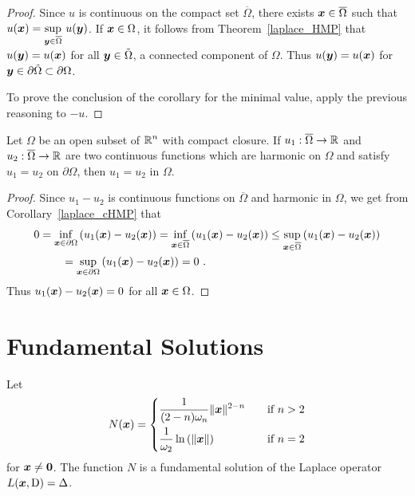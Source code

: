 \begin{proof}
Since $u$ is continuous on the compact set $\overline{\Omega}$, there
exists ${\bm{x}}\in \overline{\Omega}$ such that
$\displaystyle u({\bm{x}}) = \sup_{{\bm{y}}\in \overline{\Omega}}\, u({\bm{y}})$.
If ${\bm{x}} \in \Omega$, it follows from Theorem~\ref{laplace_HMP}
that $u({\bm{y}}) = u({\bm{x}})$ for all ${\bm{y}} \in \tilde{\Omega}$, a
connected component of $\Omega$.  Thus $u({\bm{y}}) = u({\bm{x}})$ for
${\bm{y}} \in \partial \tilde{\Omega} \subset \partial \Omega$.

To prove the conclusion of the corollary for the minimal value, apply
the previous reasoning to $-u$.
\end{proof}

\begin{theorem} \label{laplace_uniqu_th}
Let $\Omega$ be an open subset of $\displaystyle \mathbb{R}^n$ with compact
closure.  If $u_1 : \overline{\Omega} \rightarrow \mathbb{R}$ and
$u_2 : \overline{\Omega} \rightarrow \mathbb{R}$ are two continuous functions
which are harmonic on $\Omega$ and satisfy $u_1 = u_2$ on $\partial \Omega$, 
then $u_1 = u_2$ in $\Omega$.
\end{theorem}

\begin{proof}
Since $u_1-u_2$ is continuous functions on
$\overline{\Omega}$ and harmonic in $\Omega$, we get from
Corollary~\ref{laplace_cHMP} that
\begin{align*}
0 &= \inf_{{\bm{x}}\in \partial \Omega} \left(u_1({\bm{x}}) - u_2({\bm{x}})\right)
= \inf_{{\bm{x}}\in \overline{\Omega}} \left(u_1({\bm{x}}) - u_2({\bm{x}})\right)
\leq \sup_{{\bm{x}}\in \overline{\Omega}} \left(u_1({\bm{x}}) -
u_2({\bm{x}})\right) \\
& \qquad
= \sup_{{\bm{x}}\in \partial \Omega} \left(u_1({\bm{x}}) - u_2({\bm{x}})\right)
= 0 \ .
\end{align*}
Thus $\displaystyle u_1({\bm{x}}) - u_2({\bm{x}}) = 0$ for all
${\bm{x}} \in \Omega$.
\end{proof}

\section{Fundamental Solutions}

\begin{theorem} \label{laplace_fund_sol}
Let
\[
N({\bm{x}}) =
\begin{cases}
\displaystyle \frac{1}{(2-n)\omega_n} \|{\bm{x}}\|^{2-n} & \quad 
\text{if} \ n>2 \\[0.9em]
\displaystyle \frac{1}{\omega_2} \ln\left(\|{\bm{x}}\|\right) & \quad 
\text{if} \ n=2
\end{cases}
\]
for ${\bm{x}} \neq {\bm{0}}$.  The function $N$ is a fundamental
solution of the Laplace operator $L({\bm{x}},\operatorname{D}) = \Delta$.
\end{theorem}

